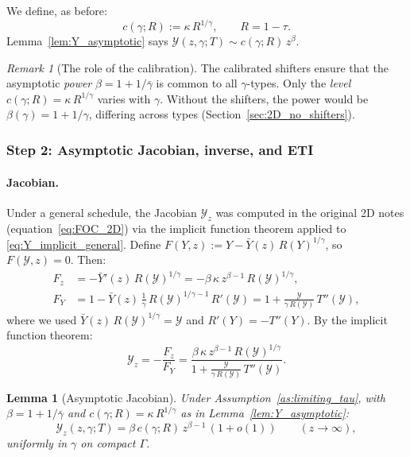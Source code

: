 \documentclass[12pt,a4paper]{article}
\theoremstyle{definition}
\theoremstyle{plain}
\newtheorem{lemma}{Lemma}[section]
\theoremstyle{remark}
\newtheorem{remark}{Remark}[section]
\newcommand{\calY}{\mathcal{Y}}
\begin{document}
We define, as before:
\begin{equation}
\label{eq:Y_top_2D}
  c(\gamma;R) := \kappa\,R^{1/\gamma}, \qquad R = 1-\tau.
\end{equation}
Lemma~\ref{lem:Y_asymptotic} says $\calY(z,\gamma;T) \sim c(\gamma;R)\,z^{\beta}$.

\begin{remark}[The role of the calibration]
\label{rem:calibration_role}
The calibrated shifters ensure that the asymptotic \emph{power} $\beta = 1 + 1/\bar\gamma$ is common to all $\gamma$-types.  Only the \emph{level} $c(\gamma;R) = \kappa\,R^{1/\gamma}$ varies with $\gamma$.  Without the shifters, the power would be $\beta(\gamma) = 1 + 1/\gamma$, differing across types (Section~\ref{sec:2D_no_shifters}).
\end{remark}

\subsubsection{Step 2: Asymptotic Jacobian, inverse, and ETI}

\paragraph{Jacobian.}
Under a general schedule, the Jacobian $\calY_z$ was computed in the original 2D notes (equation~\eqref{eq:FOC_2D}) via the implicit function theorem applied to \eqref{eq:Y_implicit_general}.  Define $F(Y,z) := Y - \bar{Y}(z)\,R(Y)^{1/\gamma}$, so $F(\calY,z) = 0$.  Then:
\begin{align*}
  F_z &= -\bar{Y}'(z)\,R(\calY)^{1/\gamma} = -\beta\,\kappa\,z^{\beta-1}\,R(\calY)^{1/\gamma}, \\
  F_Y &= 1 - \bar{Y}(z)\,\frac{1}{\gamma}\,R(\calY)^{1/\gamma-1}\,R'(\calY) = 1 + \frac{\calY}{\gamma\,R(\calY)}\,T''(\calY),
\end{align*}
where we used $\bar{Y}(z)\,R(\calY)^{1/\gamma} = \calY$ and $R'(Y) = -T''(Y)$.  By the implicit function theorem:
\begin{equation}
\label{eq:Yz_general_2D}
  \calY_z = -\frac{F_z}{F_Y} = \frac{\beta\,\kappa\,z^{\beta-1}\,R(\calY)^{1/\gamma}}{1 + \frac{\calY}{\gamma\,R(\calY)}\,T''(\calY)}.
\end{equation}

\begin{lemma}[Asymptotic Jacobian]
\label{lem:Yz_asymptotic}
Under Assumption~\ref{as:limiting_tau}, with
$\beta = 1+1/\bar\gamma$ and $c(\gamma;R) = \kappa\,R^{1/\gamma}$
as in Lemma~\ref{lem:Y_asymptotic}:
\begin{equation}
\label{eq:Yz_asymp}
  \calY_z(z,\gamma;T) = \beta\,c(\gamma;R)\,z^{\beta-1}\,(1 + o(1)) \qquad (z \to \infty),
\end{equation}
uniformly in $\gamma$ on compact $\Gamma$.
\end{lemma}
\end{document}
